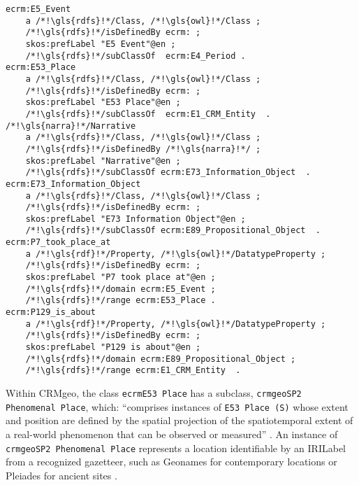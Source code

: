 \begin{lstlisting}[caption=Definition of classes and property in NOnt+S, label={lst:nont-implementation-1}]
ecrm:E5_Event
    a /*!\gls{rdfs}!*/Class, /*!\gls{owl}!*/Class ;
    /*!\gls{rdfs}!*/isDefinedBy ecrm: ;
    skos:prefLabel "E5 Event"@en ;
    /*!\gls{rdfs}!*/subClassOf  ecrm:E4_Period .
ecrm:E53_Place
    a /*!\gls{rdfs}!*/Class, /*!\gls{owl}!*/Class ;
    /*!\gls{rdfs}!*/isDefinedBy ecrm: ;
    skos:prefLabel "E53 Place"@en ;
    /*!\gls{rdfs}!*/subClassOf  ecrm:E1_CRM_Entity  .
/*!\gls{narra}!*/Narrative
    a /*!\gls{rdfs}!*/Class, /*!\gls{owl}!*/Class ;
    /*!\gls{rdfs}!*/isDefinedBy /*!\gls{narra}!*/ ;
    skos:prefLabel "Narrative"@en ;
    /*!\gls{rdfs}!*/subClassOf ecrm:E73_Information_Object  .
ecrm:E73_Information_Object
    a /*!\gls{rdfs}!*/Class, /*!\gls{owl}!*/Class ;
    /*!\gls{rdfs}!*/isDefinedBy ecrm: ;
    skos:prefLabel "E73 Information Object"@en ;
    /*!\gls{rdfs}!*/subClassOf ecrm:E89_Propositional_Object  .
ecrm:P7_took_place_at
    a /*!\gls{rdf}!*/Property, /*!\gls{owl}!*/DatatypeProperty ;
    /*!\gls{rdfs}!*/isDefinedBy ecrm: ;
    skos:prefLabel "P7 took place at"@en ;
    /*!\gls{rdfs}!*/domain ecrm:E5_Event ;
    /*!\gls{rdfs}!*/range ecrm:E53_Place .
ecrm:P129_is_about
    a /*!\gls{rdf}!*/Property, /*!\gls{owl}!*/DatatypeProperty ;
    /*!\gls{rdfs}!*/isDefinedBy ecrm: ;
    skos:prefLabel "P129 is about"@en ;
    /*!\gls{rdfs}!*/domain ecrm:E89_Propositional_Object ;
    /*!\gls{rdfs}!*/range ecrm:E1_CRM_Entity  .
\end{lstlisting}

Within CRMgeo, the class \texttt{\gls{ecrm}E53 Place} has a subclass, \texttt{\gls{crmgeo}SP2 \\Phenomenal Place}, which: ``comprises instances of \texttt{E53 Place (S)} whose extent and position are defined by the spatial projection of the spatiotemporal extent of a real-world phenomenon that can be observed or measured'' \cite{doerrCRMgeoLinkingCIDOC}. An instance of \texttt{\gls{crmgeo}SP2 Phenomenal Place} represents a location identifiable by an \acrshort{IRILabel} from a recognized gazetteer, such as Geonames for contemporary locations or Pleiades for ancient sites \cite{ahlersAssessmentAccuracyGeoNames2013, simonPleiadesGazetteerPelagios2016}.

